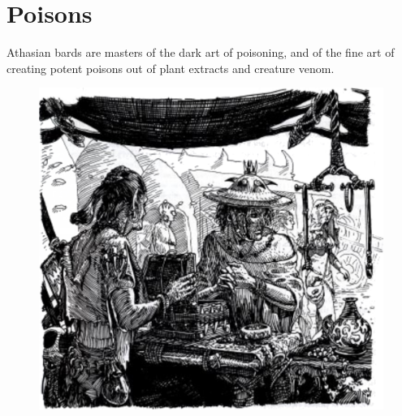 \section{Poisons}
Athasian bards are masters of the dark art of poisoning, and of the fine art of creating potent poisons out of plant extracts and creature venom.

\begin{figure}[b!]
\centering
\includegraphics[height=0.4\paperheight]{images/merchant-2.png}
\WOTC
\end{figure}

